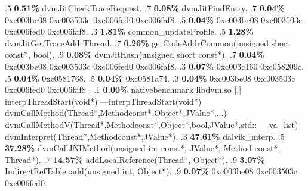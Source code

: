 \begin{profile}
{.5 \textbf{0.51\%} dvmJitCheckTraceRequest. 
.7 \textbf{0.08\%} dvmJitFindEntry. 
.7 \textbf{0.04\%} 0xc003be08\newline {} 0xc003503c\newline {} 0xc006fed0\newline {} 0xc006faf8. 
.5 \textbf{0.04\%} 0xc003be08\newline {} 0xc003503c\newline {} 0xc006fed0\newline {} 0xc006faf8. 
.3 \textbf{1.81\%} common\_updateProfile. 
.5 \textbf{1.28\%} dvmJitGetTraceAddrThread. 
.7 \textbf{0.26\%} getCodeAddrCommon(unsigned short const*, bool). 
.9 \textbf{0.08\%} dvmJitHash(unsigned short const*). 
.7 \textbf{0.04\%} 0xc003be08\newline {} 0xc003503c\newline {} 0xc006fed0\newline {} 0xc006faf8. 
.3 \textbf{0.07\%} 0xc003c160\newline {} 0xc058209c. 
.5 \textbf{0.04\%} 0xc0581768. 
.5 \textbf{0.04\%} 0xc0581a74. 
.3 \textbf{0.04\%} 0xc003be08\newline {} 0xc003503c\newline {} 0xc006fed0\newline {} 0xc006faf8\newline {} . 
.1 \textbf{ 0.00\%} nativebenchmark  libdvm.so              [.] interpThreadStart(void*)\newline {} ---interpThreadStart(void*)\newline {} dvmCallMethod(Thread*,Methodconst*,Object*,JValue*,...)\newline {} dvmCallMethodV(Thread*,Methodconst*,Object*,bool,JValue*,std::\_\_va\_list)\newline {} dvmInterpret(Thread*,Methodconst*,JValue*). 
.3 \textbf{47.61\%} dalvik\_mterp. 
.5 \textbf{37.28\%} dvmCallJNIMethod(unsigned int const*, JValue*, Method const*, Thread*). 
.7 \textbf{14.57\%} addLocalReference(Thread*, Object*). 
.9 \textbf{3.07\%} IndirectRefTable::add(unsigned int, Object*). 
.9 \textbf{0.07\%} 0xc003be08\newline {} 0xc003503c\newline {} 0xc006fed0. 
}
\end{profile}
